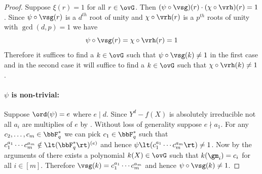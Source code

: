 \begin{proof}
  Suppose $\xi(r)=1$ for all $r\in\ovG$. Then $(\psi\circ\vsg)(r)\cdot (\chi\circ \vrh)(r)=1$. Since $\psi\circ\vsg(r)$ is a $d^{th}$ root of unity and $\chi\circ \vrh(r)$ is a $p^{th}$ roots of unity with $\gcd(d,p)=1$ we have $$\psi\circ\vsg(r)=\chi\circ\vrh(r)=1$$
  Therefore it suffices to find a $k\in \ovG$ such that $\psi\circ\vsg(k)\neq 1$ in the first case and in the second case it will suffice to find a $k\in\ovG$ such that $\chi\circ\vrh(k)\neq 1$. 

  \paragraph*{$\psi$ is non-trivial:} Suppose $\ord(\psi)=e$ where $e\mid d$. Since $Y^d-f(X)$ is absolutely irreducible not all $a_i$ are multiplies of $e$ by . Without loss of generality suppose $e\nmid a_1$. For any $c_2,\dots, c_m\in\bbF_q^*$ we can pick $c_1\in\bbF_q^*$ such that $c_1^{a_1}\cdots c_m^{a_m}\notin \lt(\bbF_q^*\rt)^{(e)}$ and hence $\psi\lt(c_1^{a_1}\cdots c_m^{a_m}\rt)\neq 1$. Now by the arguments of  there exists a polynomial $k(X)\in\ovG$ such that $k(\gm_i)=c_i$ for all $i\in[m]$. Therefore $\vsg(k)=c_1^{a_1}\cdots c_m^{a_m}$ and hence $\psi\circ \vsg(k)\neq 1$.

\end{proof}
